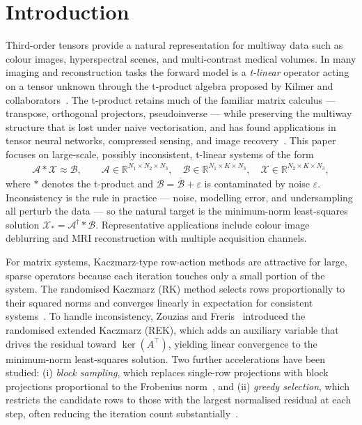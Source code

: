 \documentclass[11pt]{article}
\begin{document}
\section{Introduction}
Third-order tensors provide a natural representation for multiway data such as colour images, hyperspectral scenes, and multi-contrast medical volumes. In many imaging and reconstruction tasks the forward model is a \emph{t-linear} operator acting on a tensor unknown through the t-product algebra proposed by Kilmer and collaborators~\cite{kilmer2011facto, kilmer2013thirdOrder}. The t-product retains much of the familiar matrix calculus — transpose, orthogonal projectors, pseudoinverse — while preserving the multiway structure that is lost under naive vectorisation, and has found applications in tensor neural networks, compressed sensing, and image recovery~\cite{zhang2018, qi2021, wang2020, newman2018, miao2020gener}. This paper focuses on large-scale, possibly inconsistent, t-linear systems of the form
\begin{align}
\label{eq:eq1}
\mathcal{A} * \mathcal{X} \approx \mathcal{B}, \qquad
\mathcal{A}\in\mathbb{R}^{N_1\times N_2\times N_3},\quad
\mathcal{B}\in\mathbb{R}^{N_1\times K\times N_3},\quad
\mathcal{X}\in\mathbb{R}^{N_2\times K\times N_3},
\end{align}
where $*$ denotes the t-product and $\mathcal{B} = \overline{\mathcal{B}} + \varepsilon$ is contaminated by noise $\varepsilon$. Inconsistency is the rule in practice — noise, modelling error, and undersampling all perturb the data — so the natural target is the minimum-norm least-squares solution $\mathcal{X}_\ast = \mathcal{A}^\dagger * \mathcal{B}$. Representative applications include colour image deblurring and MRI reconstruction with multiple acquisition channels.

For matrix systems, Kaczmarz-type row-action methods are attractive for large, sparse operators because each iteration touches only a small portion of the system. The randomised Kaczmarz (RK) method selects rows proportionally to their squared norms and converges linearly in expectation for consistent systems~\cite{strohmer2009}. To handle inconsistency, Zouzias and Freris~\cite{zouzias2013rando} introduced the randomised extended Kaczmarz (REK), which adds an auxiliary variable that drives the residual toward $\ker(A^\top)$, yielding linear convergence to the minimum-norm least-squares solution. Two further accelerations have been studied: (i) \emph{block sampling}, which replaces single-row projections with block projections proportional to the Frobenius norm~\cite{necoara2019faste, du2020rando, tondji2023faster}, and (ii) \emph{greedy selection}, which restricts the candidate rows to those with the largest normalised residual at each step, often reducing the iteration count substantially~\cite{bai2018greed, bai2019greed, bai2021greed}.
\end{document}
